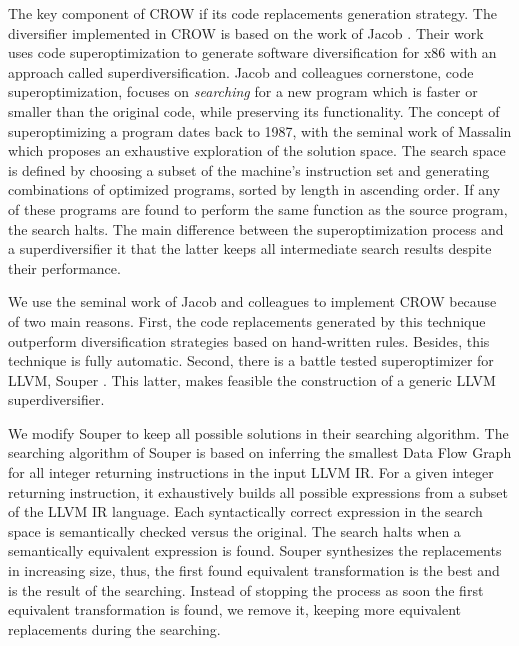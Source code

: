 
The key component of CROW if its code replacements generation strategy. The diversifier implemented in CROW is based on the work of Jacob \etal \cite{jacob2008superdiversifier}. Their work uses code superoptimization to generate software diversification for x86 with an approach called superdiversification. 
Jacob and colleagues cornerstone, code superoptimization, focuses on \emph{searching} for a new program which is faster or smaller than the original code, while preserving its functionality.
The concept of superoptimizing a program dates back to 1987, with the seminal work of Massalin \cite{Massalin1987} which proposes an exhaustive exploration of the solution space. The search space is defined by choosing a subset of the machine's instruction set and generating combinations of optimized programs, sorted by length in ascending order. If any of these programs are found to perform the same function as the source program, the search halts. The main difference between the superoptimization process and a superdiversifier it that the latter keeps all intermediate search results despite their performance. 

We use the seminal work of Jacob and colleagues to implement CROW because of two main reasons.
First, the code replacements generated by this technique outperform diversification strategies based on hand-written rules. Besides, this technique is fully automatic.
Second, there is a battle tested superoptimizer for LLVM, Souper \cite{Sasnauskas2017Souper:Superoptimizer}. This latter, makes feasible the construction of a generic LLVM superdiversifier.

We modify Souper to keep all possible solutions in their searching algorithm. The searching algorithm of Souper is based on inferring the smallest Data Flow Graph for all integer returning instructions in the input LLVM IR. For a given integer returning instruction, it exhaustively builds all possible expressions from a subset of the LLVM IR language.
Each syntactically correct expression in the search space is semantically checked versus the original. The search halts when a semantically equivalent expression is found. Souper synthesizes the replacements in increasing size, thus, the first found equivalent transformation is the best and is the result of the searching. Instead of stopping the process as soon the first equivalent transformation is found, we remove it, keeping more equivalent replacements during the searching. 

